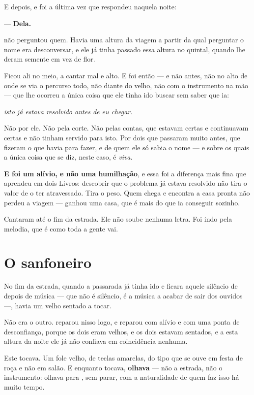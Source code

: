 \documentclass[livro.tex]{subfiles}
\begin{document}
E depois, e foi a última vez que respondeu naquela noite:

--- \textbf{Dela.}

\medskip
\noindent \Ben não perguntou quem. Havia uma altura da viagem a partir da qual
perguntar o nome era desconversar, e ele já tinha passado essa altura no
quintal, quando lhe deram semente em vez de flor.

\medskip
\noindent Ficou ali no meio, a cantar mal e alto. E foi então --- e não antes,
não no alto de onde se via o percurso todo, não diante do velho, não com o
instrumento na mão --- que lhe ocorreu a única coisa que ele tinha ido buscar
sem saber que ia:

\begin{center}
\emph{isto já estava resolvido antes de eu chegar.}
\end{center}

\noindent Não por ele. Não pela corte. Não pelas contas, que estavam certas e
continuavam certas e não tinham servido para isto. Por dois que passaram muito
antes, que fizeram o que havia para fazer, e de quem ele só sabia o nome ---
e sobre os quais a única coisa que se diz, neste caso, é \emph{viva}.

\medskip
\noindent \textbf{E foi um alívio, e não uma humilhação}, e essa foi a
diferença mais fina que \Ben aprendeu em dois Livros: descobrir que o
problema já estava resolvido não tira o valor de o ter atravessado. Tira o
peso. Quem chega e encontra a casa pronta não perdeu a viagem --- ganhou uma
casa, que é mais do que ia conseguir sozinho.

\medskip
\noindent Cantaram até o fim da estrada. Ele não soube nenhuma letra. Foi indo
pela melodia, que é como toda a gente vai.

\chapter{O sanfoneiro}

No fim da estrada, quando a passarada já tinha ido e ficara aquele silêncio de
depois de música --- que não é silêncio, é a música a acabar de sair dos
ouvidos ---, havia um velho sentado a tocar.

Não era o outro. \Ben reparou nisso logo, e reparou com alívio e com uma ponta
de desconfiança, porque os dois eram velhos, e os dois estavam sentados, e a
esta altura da noite ele já não confiava em coincidência nenhuma.

\medskip
\noindent Este tocava. Um fole velho, de teclas amarelas, do tipo que se ouve
em festa de roça e não em salão. E enquanto tocava, \textbf{olhava} --- não a
estrada, não o instrumento: olhava para \Ben , sem parar, com a naturalidade de
quem faz isso há muito tempo.
\end{document}
